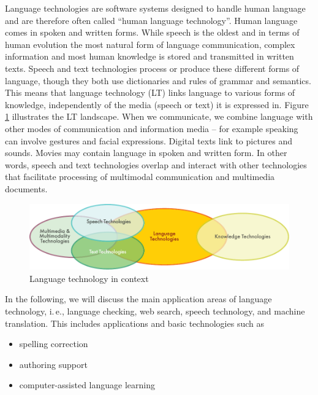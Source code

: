 \begin{multicols}{2}
Language technologies are software systems designed to handle
human language and are therefore often called “human language
technology”. Human language comes in spoken and written forms. While
speech is the oldest and in terms of human evolution the most natural
form of language communication, complex information and most human
knowledge is stored and transmitted in written texts. Speech and text
technologies process or produce these different forms of language,
though they both use dictionaries and rules of grammar and semantics.
This means that language technology (LT) links language to various
forms of knowledge, independently of the media (speech or text) it is
expressed in. Figure \ref{fig:ltincontext-eng} illustrates the LT
landscape. When we communicate, we combine language with other modes
of communication and information media – for example speaking can
involve gestures and facial expressions. Digital texts link to
pictures and sounds. Movies may contain language in spoken and written
form. In other words, speech and text technologies overlap and
interact with other technologies that facilitate processing of
multimodal communication and multimedia documents.

\begin{figure}[htb]
  \center
  \includegraphics[width=\textwidth]{../_media/english/language_technologies}
  \caption{Language technology in context}
  \label{fig:ltincontext-eng}
\end{figure}


In the following, we will discuss the main application areas of
language technology, i.\,e., language checking, web search, speech
technology, and machine translation. This includes
applications and basic technologies such as
\begin{itemize}
\item spelling correction

\item authoring support

\item computer-assisted language learning


\end{itemize}
\end{multicols}

